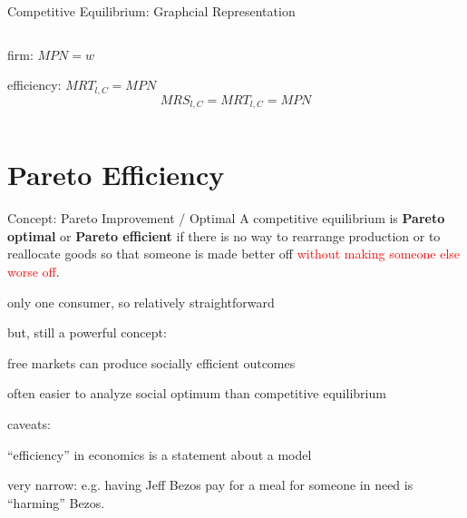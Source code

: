 \documentclass[11pt,aspectratio=169,usenames,dvipsnames]{beamer}
\newcommand{\red}[1]{\textcolor{red}{#1}}
\let\tempone\itemize
\let\temptwo\enditemize
\renewenvironment{itemize}{\tempone\addtolength{\itemsep}{\fill}}{\temptwo}
\begin{document}
\begin{frame}{Competitive Equilibrium: Graphcial Representation}
\begin{columns}
\begin{column}{0.5\textwidth}
\begin{itemize}
\begin{itemize}
                    \item firm: $ MPN = w $
                    \item efficiency: $ MRT_{l, C} = MPN $
                \end{itemize}
                \begin{equation*}
                   MRS_{l, C} = MRT_{l, C} = MPN
                \end{equation*}
            \end{itemize}
        \end{column}
    \end{columns}
\end{frame}

\section{Pareto Efficiency}
\label{sec:Pareto_Efficiency}

\begin{frame}{Concept: Pareto Improvement / Optimal}
\label{slide:Concept__Pareto_Improvement___Optimal}
    A competitive equilibrium is \textbf{Pareto optimal} or \textbf{Pareto efficient} if there is no way to \alert{rearrange production or to reallocate goods} so that \alert{someone is made better off} \red{without making someone else worse off}.
    \begin{itemize}
        \item only one consumer, so relatively straightforward
        \item but, still a powerful concept:
        \begin{itemize}
            \item free markets can produce socially efficient outcomes
            \item often easier to analyze social optimum than competitive equilibrium
        \end{itemize}
        \item caveats:
        \begin{itemize}
            \item ``efficiency'' in economics is a statement about a model
            \item very narrow: e.g. having Jeff Bezos pay for a meal for someone in need is ``harming'' Bezos.
        \end{itemize}
    \end{itemize}
\end{frame}
\end{document}

